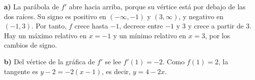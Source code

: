 \textbf{a)} La parábola de $f'$ abre hacia arriba, porque
su vértice está por debajo de las dos raíces. Su signo es
positivo en $(-\infty,-1)$ y $(3,\infty)$, y negativo en $(-1,3)$.
Por tanto, $f$ crece hasta $-1$, decrece entre $-1$ y $3$
y crece a partir de $3$. Hay un máximo relativo en $x=-1$
y un mínimo relativo en $x=3$, por los cambios de signo.

\textbf{b)} Del vértice de la gráfica de $f'$ se lee $f'(1)=-2$.
Como $f(1)=2$, la tangente es $y-2=-2(x-1)$,
es decir, $\boxed{y=4-2x}$.
